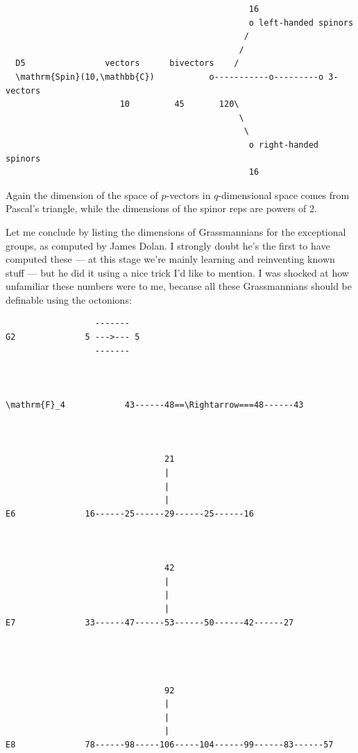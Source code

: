 \documentclass{article}
\begin{document}
\begin{itemize}
\begin{verbatim}
                                                 16
                                                 o left-handed spinors
                                                /            
                                               / 
  D5                vectors      bivectors    /
  \mathrm{Spin}(10,\mathbb{C})           o-----------o---------o 3-vectors
                       10         45       120\
                                               \
                                                \
                                                 o right-handed spinors
                                                 16
\end{verbatim}

  Again the dimension of the space of \(p\)-vectors in \(q\)-dimensional
  space comes from Pascal's triangle, while the dimensions of the spinor
  reps are powers of 2.
\end{itemize}

Let me conclude by listing the dimensions of Grassmannians for the
exceptional groups, as computed by James Dolan. I strongly doubt he's
the first to have computed these --- at this stage we're mainly learning
and reinventing known stuff --- but he did it using a nice trick I'd
like to mention. I was shocked at how unfamiliar these numbers were to
me, because all these Grassmannians should be definable using the
octonions:

\begin{verbatim}
                  -------
G2              5 --->--- 5
                  -------



\mathrm{F}_4            43------48==\Rightarrow===48------43



                                21
                                |
                                |
                                |
E6              16------25------29------25------16



                                42
                                |
                                |
                                |
E7              33------47------53------50------42------27




                                92
                                |
                                |
                                |
E8              78------98-----106-----104------99------83------57
\end{verbatim}
\end{document}
